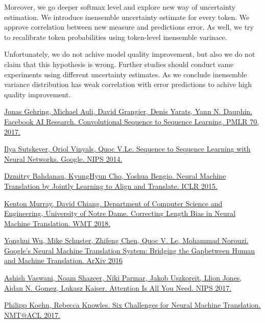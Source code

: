 \documentclass[a4paper,14pt]{extarticle}
\begin{document}
	Moreover, we go deeper softmax level and explore new way of uncertainty estimation. We introduce inensemble uncertainty estimate for every token. We approve correlation between new measure and predictions error. As well, we try to recalibrate token probabilities using token-level inensemble varinace.
	
	Unfortunately, we do not achive model quality improvement, but also we do not claim that this hypothesis is wrong. Further studies should conduct same experiments using different uncertainty estimates. As we conclude inensemble variance distribution has weak correlation with error predictions to achive high quality improvement.
	
	\begin{thebibliography}{0}		
		\hypertarget{fconv}{}
		\href{https://arxiv.org/pdf/1705.03122.pdf}
		{Jonas Gehring, Michael Auli, David Grangier, Denis Yarats, Yann N. Dauphin. Facebook AI Research. Convolutional Sequence to Sequence Learning. PMLR 70, 2017.}
		
		\hypertarget{seq2seq}{}
		\href{https://papers.nips.cc/paper/5346-sequence-to-sequence-learning-with-neural-networks.pdf}
		{Ilya Sutskever, Oriol Vinyals, Quoc V.Le. Sequence to Sequence Learning with Neural Networks. Google. NIPS 2014.}
		
		\hypertarget{encdec_att}{}
		\href{https://arxiv.org/pdf/1409.0473.pdf}
		{Dzmitry Bahdanau, KyungHyun Cho, Yoshua Bengio. Neural Machine Translation by Jointly Learning to Align and Translate. ICLR 2015.}
		
		\hypertarget{corr_len_bias}{}
		\href{https://arxiv.org/pdf/1808.10006.pdf}
		{Kenton Murray, David Chiang. Department of Computer Science and Engineering, University of Notre Dame. Correcting Length Bias in Neural Machine Translation. WMT 2018.}
		
		\hypertarget{gnmt}{}
		\href{https://arxiv.org/pdf/1609.08144.pdf}
		{Yonghui Wu, Mike Schuster, Zhifeng Chen, Quoc V. Le, Mohammad Norouzi. Google’s Neural Machine Translation System: Bridging the Gapbetween Human and Machine Translation. ArXiv 2016}
		
		\hypertarget{transformer}{}
		\href{https://arxiv.org/pdf/1706.03762.pdf}
		{Ashish Vaswani, Noam Shazeer, Niki Parmar, Jakob Uszkoreit, Llion Jones, Aidan N. Gomez, Lukasz Kaiser. Attention Is All You Need. NIPS 2017.}
		
		\hypertarget{six_chall}{}
		\href{https://arxiv.org/pdf/1706.03872.pdf}
		{Philipp Koehn, Rebecca Knowles. Six Challenges for Neural Machine Translation. NMT@ACL 2017.}
		

\end{thebibliography}
\end{document}

